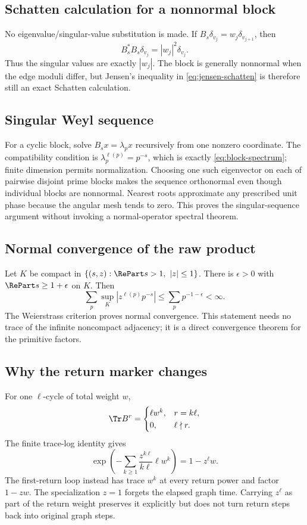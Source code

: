 \subsection{Schatten calculation for a nonnormal block}

No eigenvalue/singular-value substitution is made.  If
$B_s\delta_{v_j}=w_j\delta_{v_{j+1}}$, then
\[
B_s^*B_s\delta_{v_j}=|w_j|^2\delta_{v_j}.
\]
Thus the singular values are exactly $|w_j|$.  The block is generally
nonnormal when the edge moduli differ, but Jensen's inequality in
\eqref{eq:jensen-schatten} is therefore still an exact Schatten calculation.

\subsection{Singular Weyl sequence}

For a cyclic block, solve
$B_sx=\lambda_px$ recursively from one nonzero coordinate.  The compatibility
condition is $\lambda_p^{\ell(p)}=p^{-s}$, which is exactly
\eqref{eq:block-spectrum}; finite dimension permits normalization.  Choosing
one such eigenvector on each of pairwise disjoint prime blocks makes the
sequence orthonormal even though individual blocks are nonnormal.  Nearest
roots approximate any prescribed unit phase because the angular mesh tends
to zero.  This proves the singular-sequence argument without invoking a
normal-operator spectral theorem.

\subsection{Normal convergence of the raw product}

Let $K$ be compact in
$\{(s,z):\RePart s>1,\ |z|\le1\}$.  There is $\epsilon>0$ with
$\RePart s\ge1+\epsilon$ on $K$.  Then
\[
\sum_p\sup_K|z^{\ell(p)}p^{-s}|
\le\sum_pp^{-1-\epsilon}<\infty.
\]
The Weierstrass criterion proves normal convergence.  This statement needs
no trace of the infinite noncompact adjacency; it is a direct convergence
theorem for the primitive factors.

\subsection{Why the return marker changes}

For one $\ell$-cycle of total weight $w$,
\[
\Tr B^r=
\begin{cases}
\ell w^k,&r=k\ell,\\
0,&\ell\nmid r.
\end{cases}
\]
The finite trace-log identity gives
\[
\exp\left(-\sum_{k\ge1}
\frac{z^{k\ell}}{k\ell}\ell w^k\right)=1-z^\ell w.
\]
The first-return loop instead has trace $w^k$ at every return power and factor
$1-zw$.  The specialization $z=1$ forgets the elapsed graph time.  Carrying
$z^\ell$ as part of the return weight preserves it explicitly but does not
turn return steps back into original graph steps.

